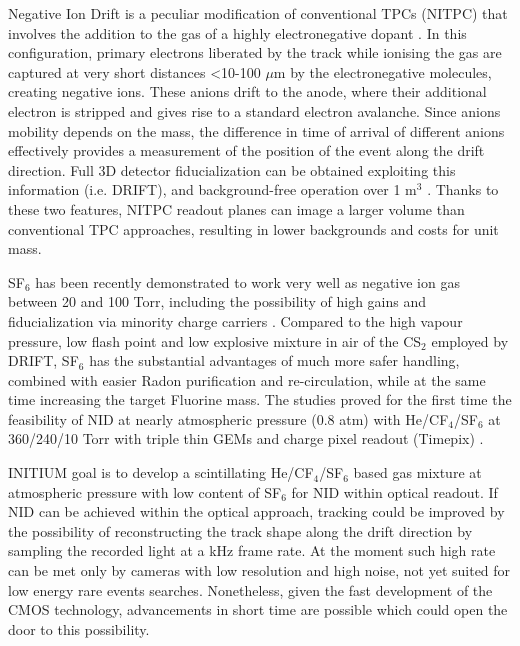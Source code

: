 \documentclass[physics,article,submit,moreauthors,pdftex]{Definitions/mdpi}
\begin{document}
Negative Ion Drift is a peculiar modification of conventional TPCs (NITPC) that involves the addition to the gas of a highly electronegative dopant \cite{Martoff:2000wi, Ohnuki:2000ex}. In this configuration, primary electrons liberated by the track while ionising the gas are captured at very short distances <10-100 $\mu$m by the electronegative molecules, creating negative ions. These anions drift to the anode, where their additional electron is stripped and gives rise to a standard electron avalanche. 
Since anions mobility depends on the mass, the difference in time of arrival of different anions effectively provides a measurement of the position of the event along the drift direction. Full 3D detector fiducialization can be obtained exploiting this information (i.e. DRIFT), and background-free operation over 1 m$^3$ \cite{Battat:2016xxe}. Thanks to these two features, NITPC readout planes can image a larger volume than conventional TPC approaches, resulting in lower backgrounds and costs for unit mass.

SF$_6$ has been recently demonstrated to work very well as negative ion gas between 20 and 100 Torr, including the possibility of high gains and fiducialization via minority charge carriers \cite{Phan:2016veo, Ikeda:2020pex, Lightfoot:2007zz}. Compared to the high vapour pressure, low flash point and low explosive mixture in air of the CS$_2$ employed by DRIFT, SF$_6$ has the substantial advantages of much more safer handling, combined with easier Radon purification and re-circulation, while at the same time increasing the target Fluorine mass. The studies proved for the first time the feasibility of NID at nearly atmospheric pressure (0.8 atm) with He/CF$_4$/SF$_6$ at 360/240/10 Torr with triple thin GEMs and charge pixel readout (Timepix) \cite{Baracchini:2017ysg}.

INITIUM goal is to develop a scintillating He/CF$_4$/SF$_6$ based gas mixture at atmospheric pressure with low content of SF$_6$ for NID within optical readout. If NID can be achieved within the optical approach, tracking could be improved by the possibility of reconstructing the track shape along the drift direction by sampling the recorded light at a kHz frame rate. At the moment such high rate can be met only by cameras with low resolution and high noise, not yet suited for low energy rare events searches. Nonetheless, given the fast development of the CMOS technology, advancements in short time are possible which could open the door to this possibility.
\end{document}
